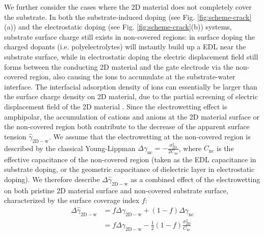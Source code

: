 \documentclass[aps,prl,reprint,groupedaddress,amsmath,amssymb, showpacs]{revtex4-1}
\begin{document}
We further consider the cases where the 2D material does not
completely cover the substrate. In both the substrate-induced doping
(see Fig. \ref{fig:scheme-crack}(a)) and the electrostatic doping (see
Fig. \ref{fig:scheme-crack}(b)) systems, substrate surface charge still
exists in non-covered regions: in surface doping the charged dopants
(i.e. polyelectrolytes) will instantly build up a EDL near the
substrate surface, while in electrostatic doping the electric
displacement field still forms between the conducting 2D material and
the gate electrode via the non-covered region, also causing the ions
to accumulate at the substrate-water interface. The interfacial
adsorption density of ions can essentially be larger than the surface
charge density on 2D material, due to the partial screening of
electric displacement field of the 2D material
\cite{tian_multiscale_2016,Shih2015PartiallyScreened,Muruganathan_2015,Huttmann_2015}. Since
the electrowetting effect is amphipolar, the accumulation of cations
and anions at the 2D material surface or the non-covered region
both contribute to the decrease of the apparent surface tension
\(\hat{\gamma}_{\mathrm{2D-w}}\). We assume that the electrowetting at
the non-covered region is described by the classical Young-Lippman
\(\Delta
\gamma_{\mathrm{nc}}=-\frac{\sigma_{\mathrm{2D}}^{2}}{2C_{\mathrm{nc}}}\),
where \(C_{\mathrm{nc}}\) is the effective capacitance of the
non-covered region (taken as the EDL capacitance in substrate doping,
or the geometric capacitance of dielectric layer in electrostatic
doping). We therefore describe \(\Delta
\hat{\gamma}_{\mathrm{2D-w}}\) as a combined effect of the
electrowetting on both pristine 2D material surface and non-covered substrate surface,
characterized by the surface coverage index \(f\):
\begin{equation}
\label{eqn:apparent-gamma-combined}
\begin{aligned}
\Delta \hat{\gamma}_{\mathrm{2D-w}} &= f \Delta \gamma_{\mathrm{2D-w}} + (1-f)\Delta \gamma_{\mathrm{nc}} \\
&= f \Delta \gamma_{\mathrm{2D-w}}  -\frac{1}{2}(1-f)\frac{\sigma_{\mathrm{2D}}^{2}}{C_{\mathrm{nc}}}
\end{aligned}
\end{equation}
\end{document}
